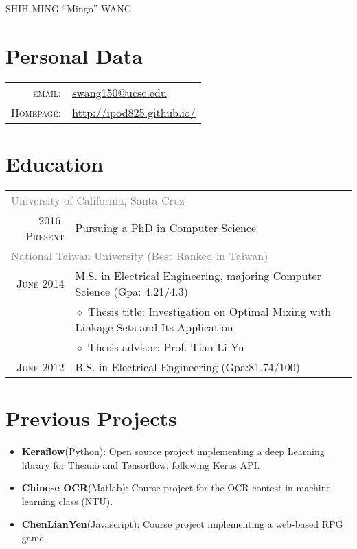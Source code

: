 \documentclass[a4paper,10pt]{article}
\begin{document}
\pagestyle{empty} %

\par{\centering
        {\Huge SHIH-MING ``Mingo'' WANG
    }\bigskip\par}

\section{Personal Data}

\begin{tabular}{rl}
    \textsc{email:}     & \href{mailto:swang150@ucsc.edu}{swang150@ucsc.edu}\\
    \textsc{Homepage:} & \href{http://ipod825.github.io/}{http://ipod825.github.io/}

\end{tabular}

\section{Education}
\begin{tabular}{r|l}
    \multicolumn{2}{l}{\textcolor{gray}{University of California, Santa Cruz}}\\
    \textsc{2016-Present}       & Pursuing a PhD in Computer Science\\
    \multicolumn{2}{l}{\textcolor{gray}{National Taiwan University (Best Ranked in Taiwan)}}\\
    \textsc{June 2014}          & M.S. in Electrical Engineering, majoring Computer Science (Gpa: 4.21/4.3)\\
                            & $\diamond$ Thesis title: Investigation on Optimal Mixing with Linkage Sets and Its Application\\
                            & $\diamond$ Thesis advisor: Prof. Tian-Li Yu\\
    \textsc{June 2012}          & B.S. in Electrical Engineering (Gpa:81.74/100)\\
\end{tabular}

\section{Previous Projects}

\begin{itemize}
    \item \textbf{Keraflow}(Python): Open source project implementing a deep Learning library for Theano and Tensorflow, following Keras API. 
    \item \textbf{Chinese OCR}(Matlab): Course project for the OCR contest in machine learning class (NTU). 
    \item \textbf{ChenLianYen}(Javascript): Course project implementing a web-based RPG game.  
\end{itemize}
\end{document}
